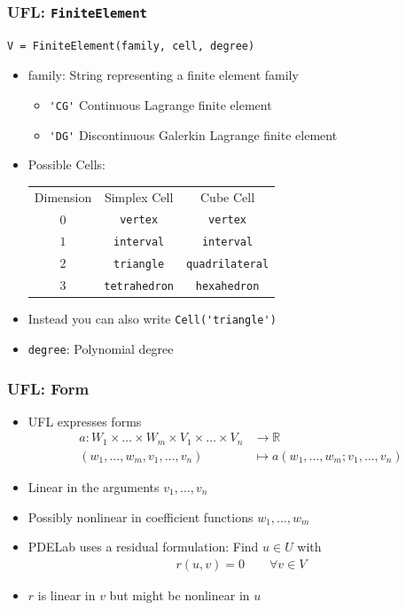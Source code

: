 \documentclass[aspectratio=169,11pt]{beamer}
\theoremstyle{definition}
\begin{document}
\begin{frame}[fragile]
  \frametitle{UFL: \lstinline{FiniteElement}}
  \begin{lstlisting}
V = FiniteElement(family, cell, degree)
  \end{lstlisting}
  \vfill
  \begin{itemize}
  \item family: String representing a finite element family
    \begin{itemize}
    \item \lstinline{'CG'} Continuous Lagrange finite element
    \item \lstinline{'DG'} Discontinuous Galerkin Lagrange finite element
    \end{itemize}
  \item Possible Cells:
    \begin{tabu}{ccc}
      Dimension & Simplex Cell & Cube Cell \\
      $0$ & \lstinline{vertex} & \lstinline{vertex} \\
      $1$ & \lstinline{interval} & \lstinline{interval} \\
      $2$ & \lstinline{triangle} & \lstinline{quadrilateral} \\
      $3$ & \lstinline{tetrahedron} & \lstinline{hexahedron} \\
    \end{tabu}
  \item Instead you can also write \lstinline{Cell('triangle')}
  \item \lstinline{degree}: Polynomial degree
  \end{itemize}
\end{frame}

\begin{frame}
  \frametitle{UFL: Form}
  \begin{itemize}
  \item UFL expresses forms
    \begin{align*}
      a: W_1\times\dots\times W_m\times V_1\times\dots\times V_n & \rightarrow \mathbb{R} \\
      (w_1,\dots ,w_m,v_1,\dots ,v_n) & \mapsto a(w_1,\dots ,w_m;v_1,\dots ,v_n)
    \end{align*}
  \item Linear in the arguments $v_1,\dots,v_n$
  \item Possibly nonlinear in coefficient functions $w_1,\dots,w_m$
  \item PDELab uses a residual formulation: Find $u\in U$ with
    \begin{align*}
      r(u,v) = 0 \qquad \forall v \in V
    \end{align*}
  \item $r$ is linear in $v$ but might be nonlinear in $u$
  \end{itemize}
\end{frame}
\end{document}
